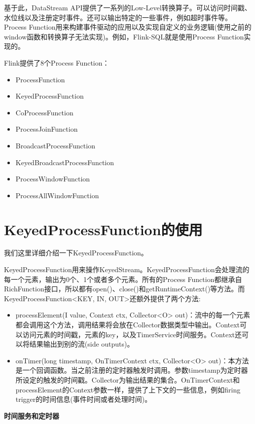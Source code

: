 \documentclass[cn,11pt,chinese]{elegantbook}
\begin{document}
基于此，DataStream API提供了一系列的Low-Level转换算子。可以访问时间戳、水位线以及注册定时事件。还可以输出特定的一些事件，例如超时事件等。Process Function用来构建事件驱动的应用以及实现自定义的业务逻辑(使用之前的window函数和转换算子无法实现)。例如，Flink-SQL就是使用Process Function实现的。

Flink提供了8个Process Function：

\begin{itemize}
    \item ProcessFunction
    \item KeyedProcessFunction
    \item CoProcessFunction
    \item ProcessJoinFunction
    \item BroadcastProcessFunction
    \item KeyedBroadcastProcessFunction
    \item ProcessWindowFunction
    \item ProcessAllWindowFunction
\end{itemize}

\section{KeyedProcessFunction的使用}

我们这里详细介绍一下KeyedProcessFunction。

KeyedProcessFunction用来操作KeyedStream。KeyedProcessFunction会处理流的每一个元素，输出为0个、1个或者多个元素。所有的Process Function都继承自RichFunction接口，所以都有open()、close()和getRuntimeContext()等方法。而KeyedProcessFunction<KEY, IN, OUT>还额外提供了两个方法:

\begin{itemize}
    \item processElement(I value, Context ctx, Collector<O> out)：流中的每一个元素都会调用这个方法，调用结果将会放在Collector数据类型中输出。Context可以访问元素的时间戳，元素的key，以及TimerService时间服务。Context还可以将结果输出到别的流(side outputs)。
    \item onTimer(long timestamp, OnTimerContext ctx, Collector<O> out)：本方法是一个回调函数。当之前注册的定时器触发时调用。参数timestamp为定时器所设定的触发的时间戳。Collector为输出结果的集合。OnTimerContext和processElement的Context参数一样，提供了上下文的一些信息，例如firing trigger的时间信息(事件时间或者处理时间)。
\end{itemize}

\textbf{时间服务和定时器}
\end{document}
